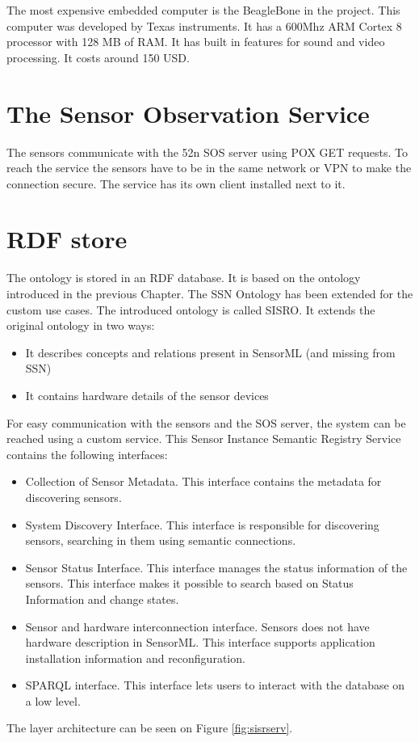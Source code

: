 The most expensive embedded computer is the BeagleBone in the project. This computer was developed by Texas instruments. It has a 600Mhz ARM Cortex 8 processor with 128 MB of RAM. It has built in features for sound and video processing. It costs around 150 USD. 

\section{The Sensor Observation Service}

The sensors communicate with the 52n SOS server using POX GET requests. To reach the service the sensors have to be in the same network or VPN to make the connection secure. The service has its own client installed next to it.

\section{RDF store}

The ontology is stored in an RDF database. It is based on the ontology introduced in the previous Chapter. The SSN Ontology has been extended for the custom use cases. The introduced ontology is called SISRO. It extends the original ontology in two ways:
\begin{itemize}
	\item It describes concepts and relations present in SensorML (and missing from SSN)
	\item It contains hardware details of the sensor devices
\end{itemize}


For easy communication with the sensors and the SOS server, the system can be reached using a custom service.
This Sensor Instance Semantic Registry Service contains the following interfaces:
\begin{itemize}
	\item Collection of Sensor Metadata. This interface contains the metadata for discovering sensors.
	\item System Discovery Interface. This interface is responsible for discovering sensors, searching in them using semantic connections.
	\item Sensor Status Interface. This interface manages the status information of the sensors. This interface makes it possible to search based on Status Information and change states.
	\item Sensor and hardware interconnection interface. Sensors does not have hardware description in SensorML. This interface supports application installation information and reconfiguration.
	\item SPARQL interface. This interface lets users to interact with the database on a low level.	  
\end{itemize}
The layer architecture can be seen on Figure \ref{fig:sisrserv}.	

